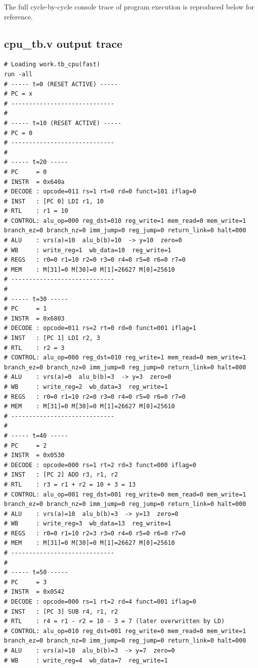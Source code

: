 \documentclass[12pt]{report}
\begin{document}
The full cycle-by-cycle console trace of program execution is reproduced below
for reference.

\subsection*{cpu\_tb.v output trace}
\begin{lstlisting}
# Loading work.tb_cpu(fast)
run -all
# ----- t=0 (RESET ACTIVE) -----
# PC = x
# -----------------------------
# 
# ----- t=10 (RESET ACTIVE) -----
# PC = 0
# -----------------------------
# 
# ----- t=20 -----
# PC     = 0
# INSTR  = 0x640a
# DECODE : opcode=011 rs=1 rt=0 rd=0 funct=101 iflag=0
# INST   : [PC 0] LDI r1, 10
# RTL    : r1 = 10
# CONTROL: alu_op=000 reg_dst=010 reg_write=1 mem_read=0 mem_write=1 branch_ez=0 branch_nz=0 imm_jump=0 reg_jump=0 return_link=0 halt=000
# ALU    : vrs(a)=10  alu_b(b)=10  -> y=10  zero=0
# WB     : write_reg=1  wb_data=10  reg_write=1
# REGS   : r0=0 r1=10 r2=0 r3=0 r4=0 r5=0 r6=0 r7=0
# MEM    : M[31]=0 M[30]=0 M[1]=26627 M[0]=25610
# -----------------------------
# 
# ----- t=30 -----
# PC     = 1
# INSTR  = 0x6803
# DECODE : opcode=011 rs=2 rt=0 rd=0 funct=001 iflag=1
# INST   : [PC 1] LDI r2, 3
# RTL    : r2 = 3
# CONTROL: alu_op=000 reg_dst=010 reg_write=1 mem_read=0 mem_write=1 branch_ez=0 branch_nz=0 imm_jump=0 reg_jump=0 return_link=0 halt=000
# ALU    : vrs(a)=0  alu_b(b)=3  -> y=3  zero=0
# WB     : write_reg=2  wb_data=3  reg_write=1
# REGS   : r0=0 r1=10 r2=0 r3=0 r4=0 r5=0 r6=0 r7=0
# MEM    : M[31]=0 M[30]=0 M[1]=26627 M[0]=25610
# -----------------------------
# 
# ----- t=40 -----
# PC     = 2
# INSTR  = 0x0530
# DECODE : opcode=000 rs=1 rt=2 rd=3 funct=000 iflag=0
# INST   : [PC 2] ADD r3, r1, r2
# RTL    : r3 = r1 + r2 = 10 + 3 = 13
# CONTROL: alu_op=001 reg_dst=001 reg_write=0 mem_read=0 mem_write=1 branch_ez=0 branch_nz=0 imm_jump=0 reg_jump=0 return_link=0 halt=000
# ALU    : vrs(a)=10  alu_b(b)=3  -> y=13  zero=0
# WB     : write_reg=3  wb_data=13  reg_write=1
# REGS   : r0=0 r1=10 r2=3 r3=0 r4=0 r5=0 r6=0 r7=0
# MEM    : M[31]=0 M[30]=0 M[1]=26627 M[0]=25610
# -----------------------------
# 
# ----- t=50 -----
# PC     = 3
# INSTR  = 0x0542
# DECODE : opcode=000 rs=1 rt=2 rd=4 funct=001 iflag=0
# INST   : [PC 3] SUB r4, r1, r2
# RTL    : r4 = r1 - r2 = 10 - 3 = 7 (later overwritten by LD)
# CONTROL: alu_op=010 reg_dst=001 reg_write=0 mem_read=0 mem_write=1 branch_ez=0 branch_nz=0 imm_jump=0 reg_jump=0 return_link=0 halt=000
# ALU    : vrs(a)=10  alu_b(b)=3  -> y=7  zero=0
# WB     : write_reg=4  wb_data=7  reg_write=1

\end{lstlisting}
\end{document}
